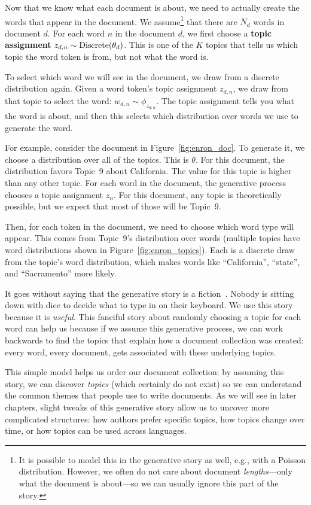 Now that we know what each document is about, we need to actually create the
words that appear in the document.  We assume\footnote{It is possible to model
  this in the generative story as well, e.g., with a Poisson distribution.
  However, we often do not care about document \emph{lengths}---only what the
  document is about---so we can usually ignore this part of the story.} that
there are $N_d$ words in document $d$.  For each word $n$ in the
document $d$, we first choose a {\bf topic assignment} $z_{d,n} \sim
\mbox{Discrete}( \theta_d)$.  This is one of the $K$ topics that tells us which topic the
word token is from, but not what the word is.

To select which word we will see in the document, we draw from a discrete
distribution again.  Given a word token's topic assignment $z_{d,n}$, we draw from that
topic to select the word: $w_{d,n} \sim \phi_{z_{d,n}}$.  The topic assignment
tells you what the word is about, and then this selects which distribution over
words we use to generate the word.  %

For example, consider the document in Figure~\ref{fig:enron_doc}.  To
generate it, we choose a distribution over all of the topics.  This is
$\theta$.  For this document, the distribution favors Topic~9 about
California.  The value for this topic is higher than any other topic.  For
each word in the document, the generative process chooses a topic
assignment $z_n$.  For this document, any topic is theoretically possible, but we expect that most of those will be Topic~9.

Then, for each token in the document, we need to choose which word type will appear.  This
comes from Topic~9's distribution over words (multiple topics have
word distributions shown in Figure~\ref{fig:enron_topics}).  Each is a
discrete draw from the topic's word distribution, which makes words
like ``California'', ``state'', and ``Sacramento'' more likely.

It goes without saying that the generative story is a fiction~\citep{box-87}.
Nobody is sitting down with dice to decide what to type in on their keyboard.
We use this story because it is \emph{useful}.  This fanciful story about randomly
choosing a topic for each word can help us because if we assume this generative
process, we can work backwards to find the topics that explain how a document
collection was created: every word, every document, gets associated with these
underlying topics.

This simple model helps us order our document collection: by assuming this story, we
can discover \emph{topics} (which certainly do not exist) so we can understand
the common themes that people use to write documents.  As we will see in later
chapters, slight tweaks of this generative story allow us to uncover more
complicated structures: how authors prefer specific topics, how topics change
over time, or how topics can be used across languages.

